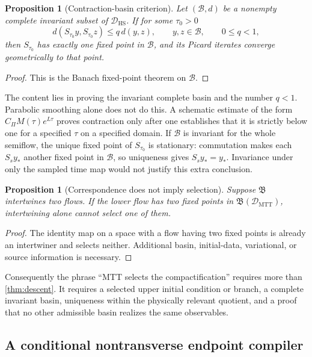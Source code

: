 \documentclass[11pt]{article}
\newtheorem{proposition}[theorem]{Proposition}
\theoremstyle{definition}
\theoremstyle{remark}
\newcommand{\cB}{\mathcal B}
\newcommand{\cD}{\mathcal D}
\begin{document}
\begin{proposition}[Contraction-basin criterion]
\label{prop:contraction}
Let \((\cB,d)\) be a nonempty complete invariant subset of
\(\cD_{\mathrm{HS}}\).  If for some \(\tau_0>0\)
\[
d(S_{\tau_0}y,S_{\tau_0}z)\le q\,d(y,z),
\qquad y,z\in\cB,\qquad 0\le q<1,
\]
then \(S_{\tau_0}\) has exactly one fixed point in \(\cB\), and its Picard
iterates converge geometrically to that point.
\end{proposition}

\begin{proof}
This is the Banach fixed-point theorem on \(\cB\).
\end{proof}

The content lies in proving the invariant complete basin and the number
\(q<1\).  Parabolic smoothing alone does not do this.  A schematic estimate
of the form \(C_\Pi M(\tau)e^{L\tau}\) proves contraction only after one
establishes that it is strictly below one for a specified \(\tau\) on a
specified domain.
If \(\cB\) is invariant for the whole semiflow, the unique fixed point of
\(S_{\tau_0}\) is stationary: commutation makes each \(S_s y_*\) another
fixed point in \(\cB\), so uniqueness gives \(S_s y_*=y_*\).  Invariance
under only the sampled time map would not justify this extra conclusion.

\begin{proposition}[Correspondence does not imply selection]
\label{prop:no-selection}
Suppose \(\mathfrak B\) intertwines two flows.  If the lower flow has two fixed
points in \(\mathfrak B(\cD_{\mathrm{MTT}})\), intertwining alone cannot select
one of them.
\end{proposition}

\begin{proof}
The identity map on a space with a flow having two fixed points is already an
intertwiner and selects neither.  Additional basin, initial-data, variational,
or source information is necessary.
\end{proof}

Consequently the phrase ``MTT selects the compactification'' requires more
than \cref{thm:descent}.  It requires a selected upper initial condition or
branch, a complete invariant basin, uniqueness within the physically relevant
quotient, and a proof that no other admissible basin realizes the same
observables.

\subsection{A conditional nontransverse endpoint compiler}
\label{sec:endpoint-compiler}
\end{document}
